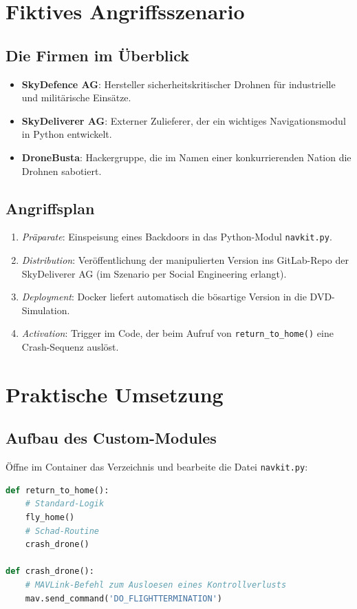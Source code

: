 \documentclass[a4paper,12pt]{report}
\begin{document}
\chapter{Fiktives Angriffsszenario}
\section{Die Firmen im Überblick}
\begin{itemize}
  \item \textbf{SkyDefence AG}: Hersteller sicherheitskritischer Drohnen für industrielle und militärische Einsätze.
  \item \textbf{SkyDeliverer AG}: Externer Zulieferer, der ein wichtiges Navigationsmodul in Python entwickelt.
  \item \textbf{DroneBusta}: Hackergruppe, die im Namen einer konkurrierenden Nation die Drohnen sabotiert.
\end{itemize}

\section{Angriffsplan}
\begin{enumerate}
  \item \emph{Präparate}: Einspeisung eines Backdoors in das Python-Modul \texttt{navkit.py}.
  \item \emph{Distribution}: Veröffentlichung der manipulierten Version ins GitLab-Repo der SkyDeliverer AG (im Szenario per Social Engineering erlangt).
  \item \emph{Deployment}: Docker liefert automatisch die bösartige Version in die DVD-Simulation.
  \item \emph{Activation}: Trigger im Code, der beim Aufruf von \texttt{return\_to\_home()} eine Crash-Sequenz auslöst.
\end{enumerate}

\chapter{Praktische Umsetzung}
\section{Aufbau des Custom-Modules}
Öffne im Container das Verzeichnis  und bearbeite die Datei \texttt{navkit.py}:
\begin{lstlisting}[language=python]
def return_to_home():
    # Standard-Logik
    fly_home()
    # Schad-Routine
    crash_drone()

def crash_drone():
    # MAVLink-Befehl zum Ausloesen eines Kontrollverlusts
    mav.send_command('DO_FLIGHTTERMINATION')
\end{lstlisting}
\end{document}
